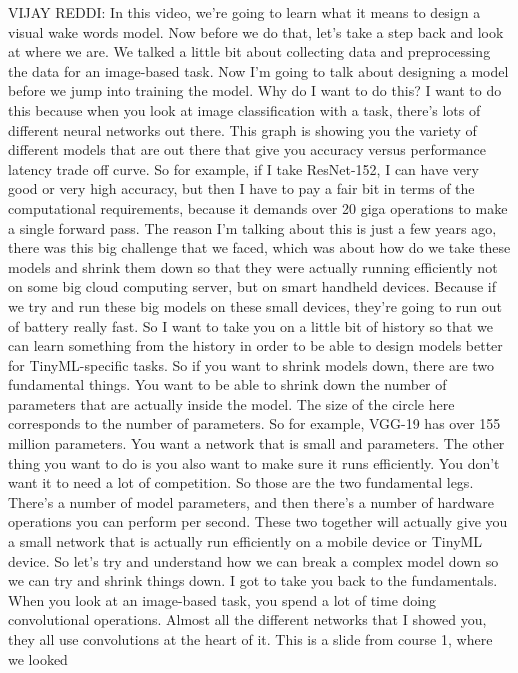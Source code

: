 VIJAY REDDI: In this video, we're going to learn what it means
to design a visual wake words model.
Now before we do that, let's take a step back and look at where we are.
We talked a little bit about collecting data and preprocessing
the data for an image-based task.
Now I'm going to talk about designing a model before we
jump into training the model.
Why do I want to do this?
I want to do this because when you look at image classification with a task,
there's lots of different neural networks out there.
This graph is showing you the variety of different models
that are out there that give you accuracy versus performance latency
trade off curve.
So for example, if I take ResNet-152, I can have very good or very high
accuracy, but then I have to pay a fair bit
in terms of the computational requirements,
because it demands over 20 giga operations
to make a single forward pass.
The reason I'm talking about this is just a few years ago,
there was this big challenge that we faced,
which was about how do we take these models
and shrink them down so that they were actually
running efficiently not on some big cloud computing server,
but on smart handheld devices.
Because if we try and run these big models on these small devices,
they're going to run out of battery really fast.
So I want to take you on a little bit of history
so that we can learn something from the history
in order to be able to design models better for TinyML-specific tasks.
So if you want to shrink models down, there are two fundamental things.
You want to be able to shrink down the number of parameters
that are actually inside the model.
The size of the circle here corresponds to the number of parameters.
So for example, VGG-19 has over 155 million parameters.
You want a network that is small and parameters.
The other thing you want to do is you also
want to make sure it runs efficiently.
You don't want it to need a lot of competition.
So those are the two fundamental legs.
There's a number of model parameters, and then there's
a number of hardware operations you can perform per second.
These two together will actually give you
a small network that is actually run efficiently on a mobile device
or TinyML device.
So let's try and understand how we can break a complex model down
so we can try and shrink things down.
I got to take you back to the fundamentals.
When you look at an image-based task, you spend a lot of time
doing convolutional operations.
Almost all the different networks that I showed you,
they all use convolutions at the heart of it.
This is a slide from course 1, where we looked
